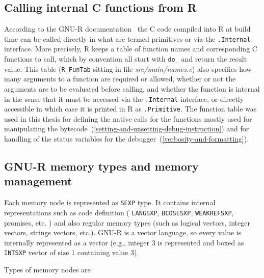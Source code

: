 \documentclass[thesis=M,english]{FITthesis}[2018/10/20]
\newcommand{\code}[1]{\texttt{#1}}
\begin{document}
\subsection{Calling internal C functions from R}

According to the GNU-R documentation~\cite{R_INTERNAL} the C code compiled into R at build time can be called directly in what are termed primitives or via the \code{.Internal} interface. More precisely, R keeps a table of function names and corresponding C functions to call, which by convention all start with \code{do{\_}} and return the result value. This table (\code{R{\_}FunTab} sitting in file \textit{src/main/names.c}) also specifies how many arguments to a function are required or allowed, whether or not the arguments are to be evaluated before calling, and whether the function is internal in the sense that it must be accessed via the \code{.Internal} interface, or directly accessible in which case it is printed in R as \code{.Primitive}. The function table was used in this thesis for defining the native calls for the functions mostly used for manipulating the bytecode~(\ref{setting-and-unsetting-debug-instruction}) and for handling of the status variables for the debugger~(\ref{verbosity-and-formatting}).
\subsection{GNU-R memory types and memory management}\label{memory-management}

Each memory node is represented as \code{SEXP} type. It contains internal representations such as code definition ( \code{LANGSXP}, \code{BCOSESXP}, \code{WEAKREFSXP}, promises, etc. ) and also regular memory types (such as logical vectors, integer vectors, strings vectors, etc.). GNU-R is a vector language, so every value is internally represented as a vector (e.g., integer 3 is represented and boxed as \code{INTSXP} vector of size 1 containing value 3).

Types of memory nodes are
\end{document}
